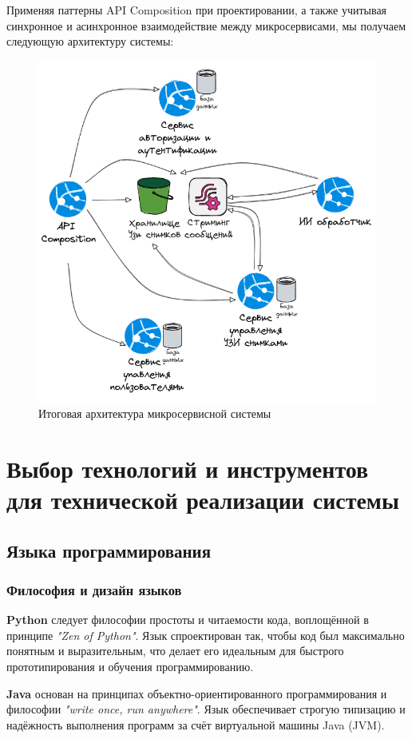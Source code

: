 Применяя паттерны API Composition при проектировании, а также учитывая синхронное и асинхронное взаимодействие между микросервисами,
мы получаем следующую архитектуру системы:
\begin{figure}[H]%
	\begin{center}
		\includegraphics[width=.6\columnwidth]{./img/new/microservice_arch.png}%
	\end{center}
	\caption{Итоговая архитектура микросервисной системы}%
	\label{pic:microservice_arch}%
\end{figure}

\section{Выбор технологий и инструментов для технической реализации системы}

\subsection{Языка программирования}

\subsubsection*{Философия и дизайн языков}

\textbf{Python} следует философии простоты и читаемости кода, воплощённой в принципе \textit{"Zen of Python"}. Язык спроектирован так, чтобы код был максимально понятным и выразительным\cite{ramalho2015pythonic}, что делает его идеальным для быстрого прототипирования и обучения программированию.

\textbf{Java} основан на принципах объектно-ориентированного программирования и философии \textit{"write once, run anywhere"}. Язык обеспечивает строгую типизацию и надёжность выполнения программ за счёт виртуальной машины Java (JVM)\cite{bloch2018java}.

